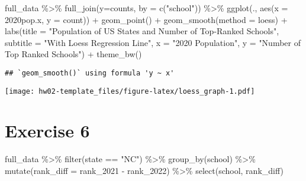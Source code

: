 \documentclass[
]{article}
\newenvironment{Shaded}{\begin{snugshade}}{\end{snugshade}}
\newcommand{\AttributeTok}[1]{\textcolor[rgb]{0.77,0.63,0.00}{#1}}
\newcommand{\FunctionTok}[1]{\textcolor[rgb]{0.00,0.00,0.00}{#1}}
\newcommand{\NormalTok}[1]{#1}
\newcommand{\SpecialCharTok}[1]{\textcolor[rgb]{0.00,0.00,0.00}{#1}}
\newcommand{\StringTok}[1]{\textcolor[rgb]{0.31,0.60,0.02}{#1}}
\begin{document}
\begin{Shaded}
\begin{Highlighting}[]
\NormalTok{full\_data }\SpecialCharTok{\%\textgreater{}\%}
  \FunctionTok{full\_join}\NormalTok{(}\AttributeTok{y=}\NormalTok{counts, }\AttributeTok{by =} \FunctionTok{c}\NormalTok{(}\StringTok{"school"}\NormalTok{)) }\SpecialCharTok{\%\textgreater{}\%}
  \FunctionTok{ggplot}\NormalTok{(., }\FunctionTok{aes}\NormalTok{(}\AttributeTok{x =} \StringTok{\textasciigrave{}}\AttributeTok{2020pop.x}\StringTok{\textasciigrave{}}\NormalTok{, }\AttributeTok{y =}\NormalTok{ count)) }\SpecialCharTok{+}
  \FunctionTok{geom\_point}\NormalTok{() }\SpecialCharTok{+}
  \FunctionTok{geom\_smooth}\NormalTok{(}\AttributeTok{method =}\NormalTok{ loess) }\SpecialCharTok{+}
  \FunctionTok{labs}\NormalTok{(}\AttributeTok{title =} \StringTok{"Population of US States and Number of Top{-}Ranked Schools"}\NormalTok{,}
       \AttributeTok{subtitle =} \StringTok{"With Loess Regression Line"}\NormalTok{,}
       \AttributeTok{x =} \StringTok{"2020 Population"}\NormalTok{, }\AttributeTok{y =} \StringTok{"Number of Top Ranked Schools"}\NormalTok{) }\SpecialCharTok{+}
  \FunctionTok{theme\_bw}\NormalTok{()}
\end{Highlighting}
\end{Shaded}

\begin{verbatim}
## `geom_smooth()` using formula 'y ~ x'
\end{verbatim}

\texttt{[image: hw02-template\_files/figure-latex/loess\_graph-1.pdf]}

\hypertarget{exercise-6}{%
\section{Exercise 6}\label{exercise-6}}

\begin{Shaded}
\begin{Highlighting}[]
\NormalTok{full\_data }\SpecialCharTok{\%\textgreater{}\%}
  \FunctionTok{filter}\NormalTok{(state }\SpecialCharTok{==} \StringTok{"NC"}\NormalTok{) }\SpecialCharTok{\%\textgreater{}\%} 
  \FunctionTok{group\_by}\NormalTok{(school) }\SpecialCharTok{\%\textgreater{}\%} 
  \FunctionTok{mutate}\NormalTok{(}\AttributeTok{rank\_diff =}\NormalTok{ rank\_2021 }\SpecialCharTok{{-}}\NormalTok{ rank\_2022) }\SpecialCharTok{\%\textgreater{}\%}
  \FunctionTok{select}\NormalTok{(school, rank\_diff)}
\end{Highlighting}
\end{Shaded}
\end{document}
